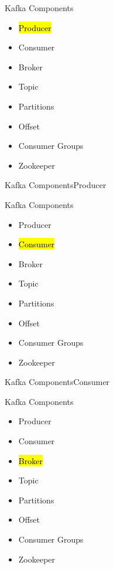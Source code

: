 \documentclass{beamer}
\begin{document}
\begin{frame}{Kafka Components}
  \begin{itemize}
    \item \hl{Producer}
    \item Consumer
    \item Broker
    \item Topic
    \item Partitions
    \item Offset
    \item Consumer Groups
    \item Zookeeper
  \end{itemize}
\end{frame}

\begin{frame}{Kafka Components}{Producer}

\end{frame}

\begin{frame}{Kafka Components}
  \begin{itemize}
    \item Producer
    \item \hl{Consumer}
    \item Broker
    \item Topic
    \item Partitions
    \item Offset
    \item Consumer Groups
    \item Zookeeper
  \end{itemize}
\end{frame}

\begin{frame}{Kafka Components}{Consumer}

\end{frame}

\begin{frame}{Kafka Components}
  \begin{itemize}
    \item Producer
    \item Consumer
    \item \hl{Broker}
    \item Topic
    \item Partitions
    \item Offset
    \item Consumer Groups
    \item Zookeeper
  \end{itemize}
\end{frame}
\end{document}
